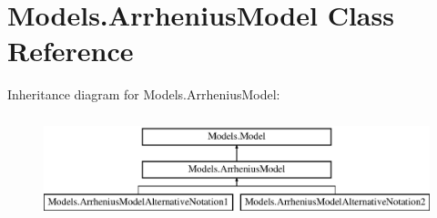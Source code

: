 \hypertarget{classModels_1_1ArrheniusModel}{\section{\-Models.\-Arrhenius\-Model \-Class \-Reference}
\label{classModels_1_1ArrheniusModel}
}
\-Inheritance diagram for \-Models.\-Arrhenius\-Model\-:\begin{figure}[H]
\begin{center}
\leavevmode
\includegraphics[height=3.000000cm]{classModels_1_1ArrheniusModel}
\end{center}
\end{figure}
